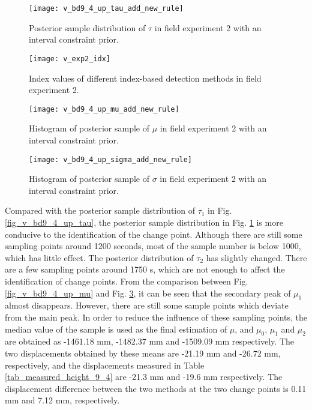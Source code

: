 \documentclass[final,3p,times]{elsarticle}
\begin{document}
	\begin{figure}[htbp]
		\centering
		\texttt{[image: v\_bd9\_4\_up\_tau\_add\_new\_rule]}
		\caption{Posterior sample distribution of $\tau$ in field experiment 2 with an interval constraint prior.}
		\label{fig_v_bd9_4_up_tau_add_new_rule}
	\end{figure} 
	\begin{figure}[htbp]
	\centering
	\texttt{[image: v\_exp2\_idx]}
	\caption{Index values of different index-based detection methods in field experiment 2.}
	\label{fig_v_exp2_idx}
	\end{figure} 
	\begin{figure}[htbp]
		\centering
		\texttt{[image: v\_bd9\_4\_up\_mu\_add\_new\_rule]}
		\caption{Histogram of posterior sample of $\mu$ in field experiment 2 with an interval constraint prior.}
		\label{fig_v_bd9_4_up_mu_add_new_rule}
	\end{figure} 
	\begin{figure}[htbp]
		\centering
		\texttt{[image: v\_bd9\_4\_up\_sigma\_add\_new\_rule]}
		\caption{Histogram of posterior sample of $\sigma$ in field experiment 2 with an interval constraint prior.}
		\label{fig_v_bd9_4_up_sigma_add_new_rule}
	\end{figure}
	Compared with the posterior sample distribution of $\tau_1$ in Fig. \ref{fig_v_bd9_4_up_tau}, the posterior sample distribution in Fig. \ref{fig_v_bd9_4_up_tau_add_new_rule} is more conducive to the identification of the change point.
	Although there are still some sampling points around 1200 seconds, most of the sample number is below 1000, which has little effect.
	The posterior distribution of $\tau_2$ has slightly changed. 
	There are a few sampling points around 1750 s, which are not enough to affect the identification of change points.
	From the comparison between Fig. \ref{fig_v_bd9_4_up_mu} and Fig. \ref{fig_v_bd9_4_up_mu_add_new_rule}, it can be seen that the secondary peak of $\mu_1$ almost disappears.
	However, there are still some sample points which deviate from the main peak.
	In order to reduce the influence of these sampling points, the median value of the sample is used as the final estimation of \textbf{$\mu$}, and $\mu_0$, $\mu_1$ and $\mu_2$ are obtained as -1461.18 mm, -1482.37 mm and -1509.09 mm respectively.
	The two displacements obtained by these means are -21.19 mm and -26.72 mm, respectively, and the displacements measured in Table \ref{tab_measured_height_9_4} are -21.3 mm and -19.6 mm respectively.  
	The displacement difference between the two methods at the two change points is 0.11 mm and 7.12 mm, respectively. 
\end{document}
